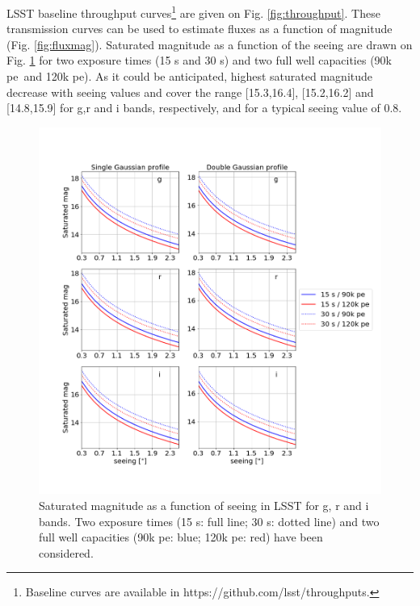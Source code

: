 \documentclass[\docopts]{\docclass}
\newcommand{\pe}{{pe}}
\begin{document}
LSST baseline throughput curves\footnote{Baseline curves are available in https://github.com/lsst/throughputs.} are given on Fig. \ref{fig:throughput}. These transmission curves can be used to estimate fluxes as a function of magnitude (Fig. \ref{fig:fluxmag}). Saturated magnitude as a function of the seeing are drawn on Fig. \ref{fig:magsat} for two exposure times (15 s and 30 s) and two full well capacities (90k \pe~and 120k \pe). As it could be anticipated, highest saturated magnitude decrease with seeing values and cover the range [15.3,16.4], [15.2,16.2] and [14.8,15.9] for g,r and i bands, respectively, and for a typical seeing value of 0.8\arcsec. 
\begin{figure}[htbp]
 \includegraphics[width=1.1\textwidth]{magsat.png}
 \caption{Saturated magnitude as a function of seeing in LSST for g, r and i bands. Two exposure times (15 s: full line; 30 s: dotted line) and two full well capacities (90k \pe: blue; 120k \pe: red) have been considered.}\label{fig:magsat}
\end{figure}
\end{document}
